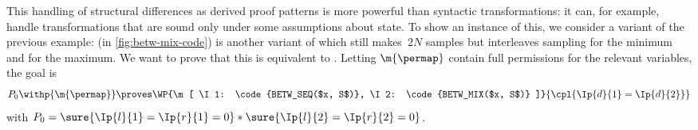 \begingroup \newcommand{\tBet}[1]{t_{\p{M}}^{#1}}



This handling of structural differences as derived proof patterns
is more powerful than syntactic transformations:
it can, for example, handle transformations that are sound only under some
assumptions about state.
To show an instance of this,
we consider a variant of the previous example:
 (in \cref{fig:betw-mix-code})
is another variant of 
which still makes~$2N$ samples but interleaves sampling
for the minimum and for the maximum.
We want to prove that this is equivalent to .
Letting $\m{\permap}$ contain full permissions for the relevant variables,
the goal is \[
  P_0\withp{\m{\permap}}
  \proves
  \WP {\m[
    \I1: \code{BETW_SEQ($x, S$)},
    \I2: \code{BETW_MIX($x, S$)}
  ]} {
    \cpl{\Ip{d}{1} = \Ip{d}{2}}
  }
\]
with $P_0 = \sure{{\Ip{l}{1}=\Ip{r}{1}=0}}*\sure{{\Ip{l}{2}=\Ip{r}{2}=0}}$.

